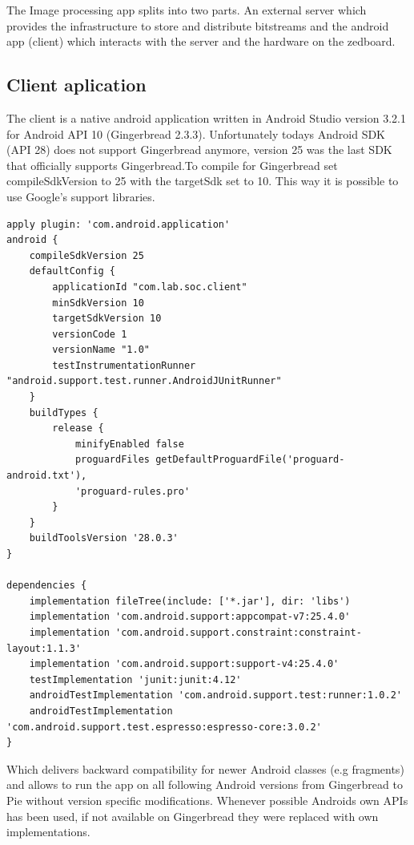 The Image processing app splits into two parts. An external server which provides the infrastructure to store and distribute bitstreams and 
the android app (client) which interacts with the server and the hardware on the zedboard. 

\subsection{Client aplication}

The client is a native android application written in Android Studio version 3.2.1 for Android API 10 (Gingerbread 2.3.3).
Unfortunately todays Android SDK (API 28) does not support Gingerbread anymore, version 25 was the last SDK that officially supports Gingerbread.To compile for Gingerbread set compileSdkVersion to 25 with the
targetSdk set to 10. This way it is possible to use Google's support libraries.

\begin{verbatim}
apply plugin: 'com.android.application'
android {
    compileSdkVersion 25
    defaultConfig {
        applicationId "com.lab.soc.client"
        minSdkVersion 10
        targetSdkVersion 10
        versionCode 1
        versionName "1.0"
        testInstrumentationRunner "android.support.test.runner.AndroidJUnitRunner"
    }
    buildTypes {
        release {
            minifyEnabled false
            proguardFiles getDefaultProguardFile('proguard-android.txt'), 
            'proguard-rules.pro'
        }
    }
    buildToolsVersion '28.0.3'
}

dependencies {
    implementation fileTree(include: ['*.jar'], dir: 'libs')
    implementation 'com.android.support:appcompat-v7:25.4.0'
    implementation 'com.android.support.constraint:constraint-layout:1.1.3'
    implementation 'com.android.support:support-v4:25.4.0'
    testImplementation 'junit:junit:4.12'
    androidTestImplementation 'com.android.support.test:runner:1.0.2'
    androidTestImplementation 'com.android.support.test.espresso:espresso-core:3.0.2'
}    
\end{verbatim}

Which delivers backward compatibility for newer Android classes (e.g fragments) and allows to run the app on all following Android versions from Gingerbread to Pie without version specific modifications. Whenever possible Androids own APIs has been used, if not available on Gingerbread they were replaced with own implementations.\newline

